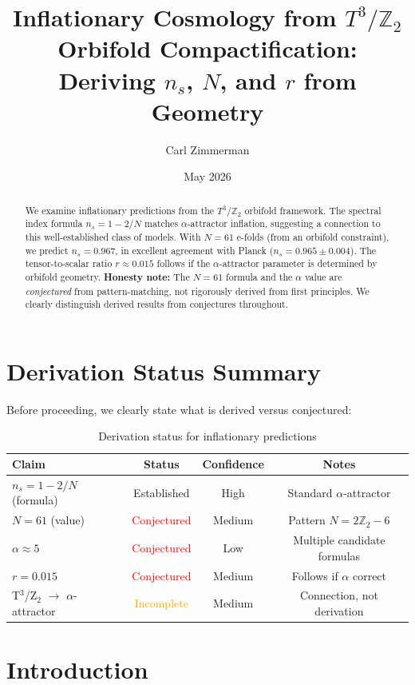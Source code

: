 \documentclass[12pt,a4paper]{article}
\title{Inflationary Cosmology from $T^3/\mathbb{Z}_2$ Orbifold Compactification:\\
Deriving $n_s$, $N$, and $r$ from Geometry}
\author{Carl Zimmerman}
\date{May 2026}
\begin{document}
\maketitle

\begin{abstract}
We examine inflationary predictions from the $T^3/\mathbb{Z}_2$ orbifold framework. The spectral index formula $n_s = 1 - 2/N$ matches $\alpha$-attractor inflation, suggesting a connection to this well-established class of models. With $N = 61$ e-folds (from an orbifold constraint), we predict $n_s = 0.967$, in excellent agreement with Planck ($n_s = 0.965 \pm 0.004$). The tensor-to-scalar ratio $r \approx 0.015$ follows if the $\alpha$-attractor parameter is determined by orbifold geometry. \textbf{Honesty note:} The $N = 61$ formula and the $\alpha$ value are \textit{conjectured} from pattern-matching, not rigorously derived from first principles. We clearly distinguish derived results from conjectures throughout.
\end{abstract}

\section{Derivation Status Summary}

Before proceeding, we clearly state what is derived versus conjectured:

\begin{table}[h]
\centering
\begin{tabular}{lccc}
\toprule
Claim & Status & Confidence & Notes \\
\midrule
$n_s = 1 - 2/N$ (formula) & Established & High & Standard $\alpha$-attractor \\
$N = 61$ (value) & \textcolor{red}{Conjectured} & Medium & Pattern $N = 2\mathbb{Z}_2 - 6$ \\
$\alpha \approx 5$ & \textcolor{red}{Conjectured} & Low & Multiple candidate formulas \\
$r = 0.015$ & \textcolor{red}{Conjectured} & Medium & Follows if $\alpha$ correct \\
T$^3$/Z$_2$ $\to$ $\alpha$-attractor & \textcolor{orange}{Incomplete} & Medium & Connection, not derivation \\
\bottomrule
\end{tabular}
\caption{Derivation status for inflationary predictions}
\end{table}

\section{Introduction}
\end{document}
